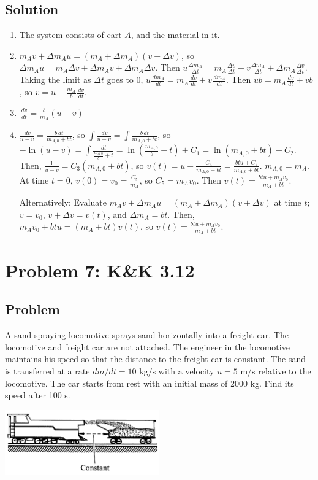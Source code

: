 \documentclass[solutions]{esg8012pset}
\renewcommand{\d}{\,d}
\begin{document}
\subsection*{Solution}
  \begin{enumerate}
    \item The system consists of cart $A$, and the material in it.
    \item $m_A v + \Delta m_A u = (m_A + \Delta m_A) (v + \Delta v)$, so $\Delta m_A u = m_A \Delta v + \Delta m_A v + \Delta m_A \Delta v$.  Then $u \frac{\Delta m_A}{\Delta t} = m_A\frac{\Delta v}{\Delta t} + v\frac{\Delta m_A}{\Delta t} + \Delta m_A \frac{\Delta v}{\Delta t}$.  Taking the limit as $\Delta t$ goes to 0, $u\frac{\d m_A}{\d t} = m_A \frac{\d v}{\d t} + v\frac{\d m_A}{\d t}$.  Then $ub = m_A \frac{\d v}{\d t} + vb$, so $v = u - \frac{m_A}{b}\frac{\d v}{\d t}$.
    \item $\frac{\d v}{\d t} = \frac{b}{m_A}(u - v)$
    \item $\frac{\d v}{u - v} = \frac{b\d t}{m_{A, 0} + bt}$, so $\int \frac{\d v}{u - v} = \int \frac{b\d t}{m_{A, 0} + bt}$, so $-\ln(u - v) = \int\frac{\d t}{\frac{m_{A,0}}{b} + t} = \ln\left(\frac{m_{A,0}}{b} + t\right) + C_1 = \ln(m_{A,0} + b t) + C_2$.  Then, $\frac{1}{u - v} = C_3 (m_{A,0} + bt)$, so $v(t) = u - \frac{C_4}{m_{A,0} + bt} = \frac{b t u + C_5}{m_{A, 0} + b t}$.  $m_{A, 0} = m_A$.  At time $t = 0$, $v(0) = v_0 = \frac{C_5}{m_A}$, so $C_5 = m_A v_0$.  Then $v(t) = \frac{b t u + m_A v_0}{m_A + b t}$. \par
    Alternatively: Evaluate $m_A v + \Delta m_A u = (m_A + \Delta m_A) (v + \Delta v)$ at time $t$; $v = v_0$, $v + \Delta v = v(t)$, and $\Delta m_A = b t$.  Then, $m_A v_0 + b t u = (m_A + b t)v(t)$, so $v(t) = \frac{b t u + m_A v_0}{m_A + b t}$.
  \end{enumerate}
\section*{Problem 7: K\&K 3.12}
\subsection*{Problem}
  A sand-spraying locomotive sprays sand horizontally into a freight car. The locomotive and freight car are not attached. The engineer in the locomotive maintains his speed so that the distance to the freight car is constant. The sand is transferred at a rate $d m / d t = 10$ kg/s with a velocity $u = 5$ m/s relative to the locomotive. The car starts from rest with an initial mass of 2000 kg. Find its speed after 100 s.
  \begin{center}\includegraphics[width=0.5\textwidth]{ps_04_3}\end{center}
\end{document}
